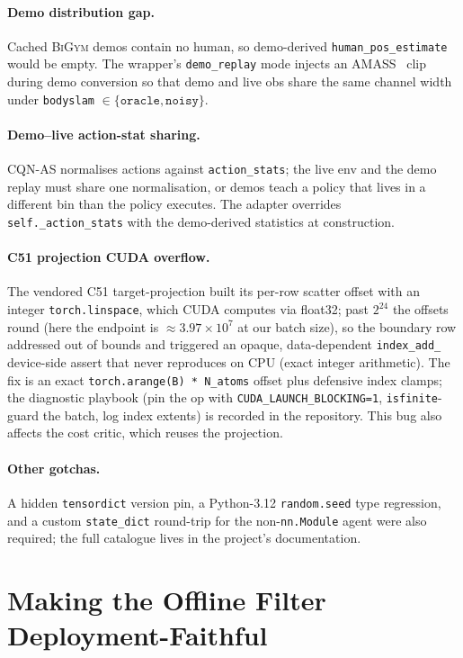 \documentclass[11pt,a4paper]{report}
\newcommand{\bigym}{\textsc{BiGym}}
\newcommand{\cqnas}{CQN-AS}
\begin{document}
\paragraph{Demo distribution gap.}
Cached \bigym{} demos contain no human, so demo-derived
\texttt{human\_pos\_estimate} would be empty. The wrapper's
\texttt{demo\_replay} mode injects an
AMASS~\cite{mahmood2019amass} clip during demo conversion so that
demo and live obs share the same channel width under
\texttt{bodyslam} $\in \{\texttt{oracle}, \texttt{noisy}\}$.

\paragraph{Demo--live action-stat sharing.}
\cqnas{} normalises actions against \texttt{action\_stats}; the
live env and the demo replay must share one normalisation, or
demos teach a policy that lives in a different bin than the policy
executes. The adapter overrides \texttt{self.\_action\_stats} with
the demo-derived statistics at construction.

\paragraph{C51 projection CUDA overflow.}
The vendored C51 target-projection built its per-row scatter offset
with an integer \texttt{torch.linspace}, which CUDA computes via
float32; past $2^{24}$ the offsets round (here the endpoint is
$\approx 3.97 \times 10^7$ at our batch size), so the boundary row
addressed out of bounds and triggered an opaque, data-dependent
\texttt{index\_add\_} device-side assert that never reproduces on
CPU (exact integer arithmetic). The fix is an exact
\texttt{torch.arange(B) * N\_atoms} offset plus defensive index
clamps; the diagnostic playbook (pin the op with
\texttt{CUDA\_LAUNCH\_BLOCKING=1}, \texttt{isfinite}-guard the
batch, log index extents) is recorded in the repository. This bug
also affects the cost critic, which reuses the projection.

\paragraph{Other gotchas.}
A hidden \texttt{tensordict} version pin, a Python-3.12
\texttt{random.seed} type regression, and a custom
\texttt{state\_dict} round-trip for the non-\texttt{nn.Module} agent
were also required; the full catalogue lives in the project's
documentation.

\section{Making the Offline Filter Deployment-Faithful}
\label{sec:impl:svf-faithful}
\end{document}
